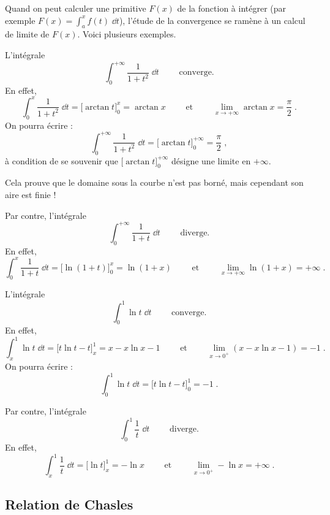 \documentclass[class=report,crop=false]{standalone}
\begin{document}
Quand on peut calculer une primitive $F(x)$ de la fonction à intégrer (par 
exemple $F(x)=\int_a^{x} f(t)\;\dd t$),
l'étude de la convergence se ramène à un calcul de limite de $F(x)$. 
Voici plusieurs exemples.


\begin{exemple}
L'intégrale
$$
\int_0^{+\infty} \frac{1}{1+t^2}\;\dd t\qquad \text{ converge.}
$$
En effet,
$$
\int_0^{x} \frac{1}{1+t^2}\;\dd t =\Big[\arctan t\Big]_0^x
=\arctan x
\qquad \text{ et } \qquad 
\lim_{x\rightarrow+\infty}\arctan x = \frac{\pi}{2}\;.
$$
On pourra écrire :
$$
\int_0^{+\infty} \frac{1}{1+t^2}\;\dd t = \Big[\arctan t\Big]_0^{+\infty}
=\frac{\pi}{2}\;,
$$
à condition de se souvenir que $\Big[\arctan t\Big]_0^{+\infty}$
désigne une limite en $+\infty$.  


Cela prouve que le domaine sous la courbe n'est pas borné, mais 
cependant son aire est finie !
\end{exemple}

\begin{exemple}
Par contre, l'intégrale
$$
\int_0^{+\infty} \frac{1}{1+t}\;\dd t\qquad \text{ diverge.}
$$
En effet,
$$
\int_0^{x} \frac{1}{1+t}\;\dd t = \Big[\ln(1+t)\Big]_0^x
=\ln(1+x)
\qquad \text{ et } \qquad 
\lim_{x\rightarrow+\infty}\ln(1+x) = +\infty\;.
$$  
\end{exemple}

\begin{exemple}
L'intégrale
$$
\int_0^1 \ln t\;\dd t\qquad \text{ converge.}
$$
En effet,
$$
\int_x^1 \ln t\;\dd t = \Big[t\ln t-t\Big]_x^1 = x-x\ln x-1
\qquad \text{ et } \qquad 
\lim_{x\rightarrow 0^+} (x-x\ln x-1) = -1\;.
$$
On pourra écrire :
$$
\int_0^1 \ln t\;\dd t = \Big[t\ln t-t\Big]_0^1 = -1\;.
$$  
\end{exemple}

\begin{exemple}
Par contre, l'intégrale
$$
\int_0^1 \frac{1}{t}\;\dd t\qquad \text{ diverge.}
$$
En effet,
$$
\int_x^1 \frac{1}{t}\;\dd t = \Big[\ln t\Big]_x^1 = -\ln x
\qquad \text{ et } \qquad 
\lim_{x\rightarrow 0^+} -\ln x = +\infty\;.
$$  
\end{exemple}






\subsection{Relation de Chasles}
\end{document}

